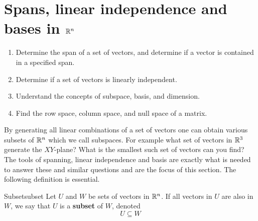 \chapter{Spans, linear independence and bases in \texorpdfstring{$\mathbb{R}^{n}$}{Rn}}
  
\begin{outcome}
  \begin{enumerate}
  \item Determine the span of a set of vectors, and determine if a
    vector is contained in a specified span.
  \item Determine if a set of vectors is linearly independent.
  \item Understand the concepts of subspace, basis, and dimension.
  \item Find the row space, column space, and null space of a matrix.
  \end{enumerate}
\end{outcome}

By generating all linear combinations of a set of vectors one can
obtain various subsets of $\mathbb{R}^{n}$ which we call
subspaces. For example what set of vectors in $\mathbb{R}^{3}$
generate the $XY$-plane? What is the smallest such set of vectors can
you find? The tools of spanning, linear independence and basis are
exactly what is needed to answer these and similar questions and are the focus of this section. The following definition is essential.

\begin{definition}{Subset}{subset}
Let $U$ and $W$ be sets of vectors in $\mathbb{R}^n$. If all vectors in $U$ are also in $W$, we say that $U$ is a \textbf{subset} of $W$, denoted 
\[
U \subseteq W
\]
\end{definition}
